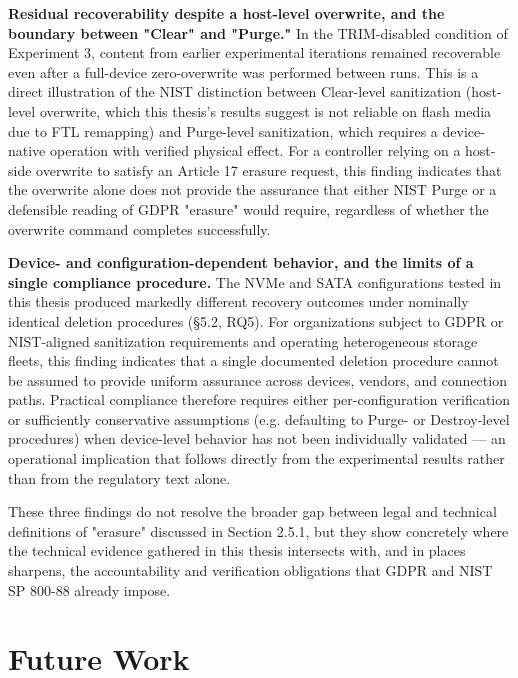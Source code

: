 \textbf{Residual recoverability despite a host-level overwrite, and the boundary between "Clear" and "Purge."} In the TRIM-disabled condition of Experiment 3, content 
from earlier experimental iterations remained recoverable even after a full-device zero-overwrite was performed between runs. This is a direct illustration of the NIST 
distinction between Clear-level sanitization (host-level overwrite, which this thesis's results suggest is not reliable on flash media due to FTL remapping) and 
Purge-level sanitization, which requires a device-native operation with verified physical effect. For a controller relying on a host-side overwrite to satisfy an 
Article 17 erasure request, this finding indicates that the overwrite alone does not provide the assurance that either NIST Purge or a defensible reading of GDPR 
"erasure" would require, regardless of whether the overwrite command completes successfully.

\textbf{Device- and configuration-dependent behavior, and the limits of a single compliance procedure.} The NVMe and SATA configurations tested in this thesis produced 
markedly different recovery outcomes under nominally identical deletion procedures (§5.2, RQ5). For organizations subject to GDPR or NIST-aligned sanitization 
requirements and operating heterogeneous storage fleets, this finding indicates that a single documented deletion procedure cannot be assumed to provide uniform 
assurance across devices, vendors, and connection paths. Practical compliance therefore requires either per-configuration verification or sufficiently conservative 
assumptions (e.g. defaulting to Purge- or Destroy-level procedures) when device-level behavior has not been individually validated — an operational implication that 
follows directly from the experimental results rather than from the regulatory text alone.

These three findings do not resolve the broader gap between legal and technical definitions of "erasure" discussed in Section 2.5.1, but they show concretely where the 
technical evidence gathered in this thesis intersects with, and in places sharpens, the accountability and verification obligations that GDPR and NIST SP 800-88 
already impose.

\section{Future Work}

